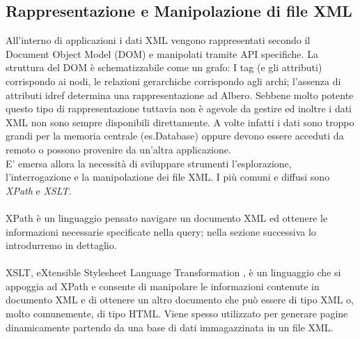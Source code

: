 \subsection{Rappresentazione e Manipolazione di file XML}
All'interno di applicazioni i dati XML vengono rappresentati secondo il Document Object Model (DOM) e manipolati tramite API specifiche. La struttura del DOM è schematizzabile come un grafo: I tag (e gli attributi) corrispondo ai nodi, le relazioni gerarchiche corrispondo agli archi; l'assenza di attributi idref determina una rappresentazione ad Albero. Sebbene molto potente questo tipo di rappresentazione tuttavia non è agevole da gestire ed inoltre i dati XML non sono sempre disponibili direttamente. A volte infatti i dati sono troppo grandi per la memoria centrale (es.Database) oppure devono essere acceduti da remoto o possono provenire da un'altra applicazione.\\E' emersa allora la necessità di sviluppare strumenti l'esplorazione, l'interrogazione e la manipolazione dei file XML. I più comuni e diffusi sono \emph{XPath} e \emph{XSLT}.
\\\\
XPath è un linguaggio pensato navigare un documento XML ed ottenere le informazioni necessarie specificate nella query; nella sezione successiva lo introdurremo in dettaglio.
\\\\
XSLT, eXtensible Stylesheet Language Transformation , è un linguaggio che si appoggia ad XPath e consente di manipolare le informazioni contenute in documento XML e di ottenere un altro documento che può essere di tipo XML o, molto comunemente, di tipo HTML. Viene spesso utilizzato per generare pagine dinamicamente partendo da una base di dati immagazzinata in un file XML.

